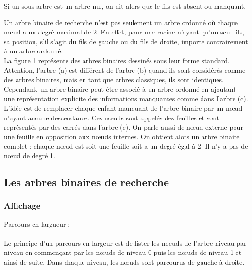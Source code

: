 \documentclass{report}
\begin{document}
Si un sous-arbre est un arbre nul, on dit alors que le fils est absent ou manquant.\\

\begin{center}
\label{fig1}
\end{center} 

Un arbre binaire de recherche n'est pas seulement un arbre ordonné où chaque nœud a un degré maximal de 2.  En effet, pour une racine n'ayant qu'un seul fils, sa position, s'il s'agit du fils de gauche ou du fils de droite, importe contrairement à un arbre ordonné.\\
La figure 1 représente des arbres binaires dessinés sous leur forme standard. Attention, l'arbre (a) est différent de l'arbre (b) quand ils sont considérés comme des arbres binaires, mais en tant que arbres classiques, ils sont identiques.\\
Cependant, un arbre binaire peut être associé à un arbre ordonné en ajoutant une représentation explicite des informations manquantes comme dans l'arbre (c). L'idée est de remplacer chaque enfant manquant de l'arbre binaire par un nœud n'ayant aucune descendance. Ces nœuds sont appelés des feuilles et sont représentés par des carrés dans l'arbre (c). On parle aussi de nœud externe pour une feuille en opposition aux nœuds internes. On obtient alors un arbre binaire complet : chaque nœud est soit une feuille soit a un degré égal à 2. Il n'y a pas de nœud de degré 1.\\


\subsection{Les arbres binaires de recherche}
\subsubsection{Affichage}

Parcours en largueur : \\
~\\
Le principe d'un parcours en largeur est de lister les noeuds de l'arbre niveau par niveau en commençant par les nœuds de niveau 0 puis les nœuds de niveau 1 et ainsi de suite. Dans chaque niveau, les nœuds sont parcourus de gauche à droite.\\ 

\end{document}
